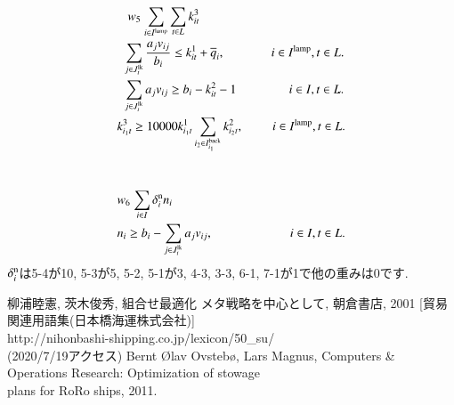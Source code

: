 \documentclass[a4j,11pt,twocolumn]{jsarticle}
\begin{document}
 \\
\begin{align}
&\hspace{0.85em}w_5 \hspace{0.1em}  \sum_{i \in I^{\rm{lamp}}} \sum_{t \in L} {k_{it}^3} \\
&\hspace{0.45em} \sum_{j \in J_{t}^{\rm{lk}}} \frac{a_{j} v_{ij}} {b_{i}} \leq k^1_{it} + \overline{q}_{i}, \hspace{3.75em} i \in I^{\rm{lamp}}, t \in L. \\
&\hspace{0.45em} \sum_{j \in J_{t}^{\rm{lk}}} a_{j} v_{ij}  \geq b_i - k^2_{it} - 1 \hspace{4.26em} i \in I, t \in L. \\
&k^3_{i_1t} \geq 10000 k^1_{i_1t} \sum_{i_2 \in I_{i_1}^{\rm{back}}} k^2_{i_2t}, \hspace{2.35em} i \in I^{\rm{lamp}}, t \in L.
\end{align}

\newpage
{} \\
\begin{align}
&w_6 \hspace{0.1em} \sum_{i \in I} \delta_i^{\rm{n}} {n_{i}} \\
&n_{i} \geq b_{i} - \sum_{j \in J_{t}^{\rm{lk}}} a_j v_{ij}, \hspace{6.2em} i \in I, t \in L.
\end{align}
$ \delta_i^{\rm{n}} $は5-4が10, 5-3が5, 5-2, 5-1が3, 4-3, 3-3, 6-1, 7-1が1で他の重みは0です.
\begin{thebibliography}{2}
 柳浦睦憲, 茨木俊秀, 組合せ最適化 メタ戦略を中心として, 朝倉書店, 2001
 [貿易関連用語集(日本橋海運株式会社)]  \\http://nihonbashi-shipping.co.jp/lexicon/50\_su/ \\ (2020/7/19アクセス)
 Bernt {\O}lav Ovsteb{\o}, Lars Magnus, Computers \& Operations Research: Optimization of stowage \\ plans for RoRo ships, 2011.
\end{thebibliography}
\end{document}
